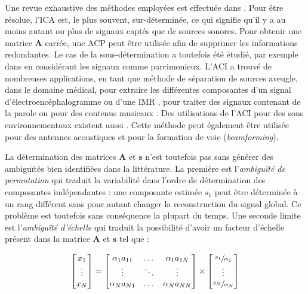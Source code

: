 Une revue exhaustive des méthodes employées est effectuée dans \cite{hyvarinen2004independent}.
Pour être résolue, l'ICA est, le plus souvent, sur-déterminée, ce qui signifie qu'il y a au moins autant ou plus de signaux captés que de sources sonores. Pour obtenir une matrice $\mathbf{A}$ carrée, une ACP peut être utilisée afin de supprimer les informations redondantes.  Le cas de la sous-détermination a toutefois été étudié, par exemple dans \cite{bofill2000blind} en considérant les signaux comme parcimonieux.
L'ACI a trouvé de nombreuses applications, en tant que méthode de séparation de sources aveugle, dans le domaine médical, pour extraire les différentes composantes d'un signal d'électroencéphalogramme \cite{delorme2007enhanced,makeig1996independent} ou d'une IMR \cite{lee1999independent}, pour traiter des signaux contenant de la parole \cite{sarela2005denoising, hsieh2009independent} ou pour des contenus musicaux \cite{uhle2003extraction, abdallah2003independent}. Des utilisations de l'ACI pour des sons environnementaux existent aussi \cite{lombard2011tdoa, eronen2006audio}. Cette méthode peut également être utilisée pour des antennes acoustiques et pour la formation de voie (\textit{beamforming})\cite{cardoso_blind_1998,saruwatari2003blind}.

La détermination des matrices $\mathbf{A}$ et $\mathbf{s}$ n'est toutefois pas sans générer des ambiguïtés bien identifiées dans la littérature. La première est l'\textit{ambiguïté de permutation} qui traduit la variabilité dans l'ordre de détermination des composantes indépendantes : une composante estimée $s_1$ peut être déterminée à un rang différent sans pour autant changer la reconstruction du signal global. Ce problème est toutefois sans conséquence la plupart du temps. Une seconde limite est l'\textit{ambiguïté d'échelle} qui traduit la possibilité d'avoir un facteur d'échelle présent dans la matrice $\mathbf{A}$ et $\mathbf{s}$ tel que :

\begin{equation}
\begin{bmatrix}
x_{1}\\
\vdots\\
x_{N}
\end{bmatrix} =
\begin{bmatrix}
\alpha_1 a_{11} & \dots & \alpha_1 a_{1N}\\
\vdots & \ddots & \vdots\\
\alpha_N a_{N1} & \dots & \alpha_N a_{NN}
\end{bmatrix}
\times
\begin{bmatrix}
\sfrac{s_{1}}{\alpha_1}\\
\vdots\\
\sfrac{s_{N}}{\alpha_N}
\end{bmatrix}
\end{equation}

